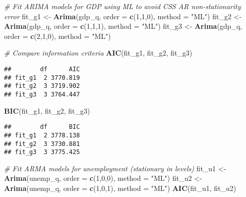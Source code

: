 \documentclass[
]{article}
\newenvironment{Shaded}{\begin{snugshade}}{\end{snugshade}}
\newcommand{\AttributeTok}[1]{\textcolor[rgb]{0.13,0.29,0.53}{#1}}
\newcommand{\CommentTok}[1]{\textcolor[rgb]{0.56,0.35,0.01}{\textit{#1}}}
\newcommand{\DecValTok}[1]{\textcolor[rgb]{0.00,0.00,0.81}{#1}}
\newcommand{\FunctionTok}[1]{\textcolor[rgb]{0.13,0.29,0.53}{\textbf{#1}}}
\newcommand{\NormalTok}[1]{#1}
\newcommand{\OtherTok}[1]{\textcolor[rgb]{0.56,0.35,0.01}{#1}}
\newcommand{\StringTok}[1]{\textcolor[rgb]{0.31,0.60,0.02}{#1}}
\begin{document}
\begin{Shaded}
\begin{Highlighting}[]
\CommentTok{\# Fit ARIMA models for GDP using ML to avoid CSS AR non{-}stationarity error}
\NormalTok{fit\_g1 }\OtherTok{\textless{}{-}} \FunctionTok{Arima}\NormalTok{(gdp\_q, }\AttributeTok{order =} \FunctionTok{c}\NormalTok{(}\DecValTok{1}\NormalTok{,}\DecValTok{1}\NormalTok{,}\DecValTok{0}\NormalTok{), }\AttributeTok{method =} \StringTok{"ML"}\NormalTok{)}
\NormalTok{fit\_g2 }\OtherTok{\textless{}{-}} \FunctionTok{Arima}\NormalTok{(gdp\_q, }\AttributeTok{order =} \FunctionTok{c}\NormalTok{(}\DecValTok{1}\NormalTok{,}\DecValTok{1}\NormalTok{,}\DecValTok{1}\NormalTok{), }\AttributeTok{method =} \StringTok{"ML"}\NormalTok{)}
\NormalTok{fit\_g3 }\OtherTok{\textless{}{-}} \FunctionTok{Arima}\NormalTok{(gdp\_q, }\AttributeTok{order =} \FunctionTok{c}\NormalTok{(}\DecValTok{2}\NormalTok{,}\DecValTok{1}\NormalTok{,}\DecValTok{0}\NormalTok{), }\AttributeTok{method =} \StringTok{"ML"}\NormalTok{)}

\CommentTok{\# Compare information criteria}
\FunctionTok{AIC}\NormalTok{(fit\_g1, fit\_g2, fit\_g3)}
\end{Highlighting}
\end{Shaded}

\begin{verbatim}
##        df      AIC
## fit_g1  2 3770.819
## fit_g2  3 3719.902
## fit_g3  3 3764.447
\end{verbatim}

\begin{Shaded}
\begin{Highlighting}[]
\FunctionTok{BIC}\NormalTok{(fit\_g1, fit\_g2, fit\_g3)}
\end{Highlighting}
\end{Shaded}

\begin{verbatim}
##        df      BIC
## fit_g1  2 3778.138
## fit_g2  3 3730.881
## fit_g3  3 3775.425
\end{verbatim}

\begin{Shaded}
\begin{Highlighting}[]
\CommentTok{\# Fit ARMA models for unemployment (stationary in levels)}
\NormalTok{fit\_u1 }\OtherTok{\textless{}{-}} \FunctionTok{Arima}\NormalTok{(unemp\_q, }\AttributeTok{order =} \FunctionTok{c}\NormalTok{(}\DecValTok{1}\NormalTok{,}\DecValTok{0}\NormalTok{,}\DecValTok{0}\NormalTok{), }\AttributeTok{method =} \StringTok{"ML"}\NormalTok{)}
\NormalTok{fit\_u2 }\OtherTok{\textless{}{-}} \FunctionTok{Arima}\NormalTok{(unemp\_q, }\AttributeTok{order =} \FunctionTok{c}\NormalTok{(}\DecValTok{1}\NormalTok{,}\DecValTok{0}\NormalTok{,}\DecValTok{1}\NormalTok{), }\AttributeTok{method =} \StringTok{"ML"}\NormalTok{)}
\FunctionTok{AIC}\NormalTok{(fit\_u1, fit\_u2)}
\end{Highlighting}
\end{Shaded}
\end{document}
